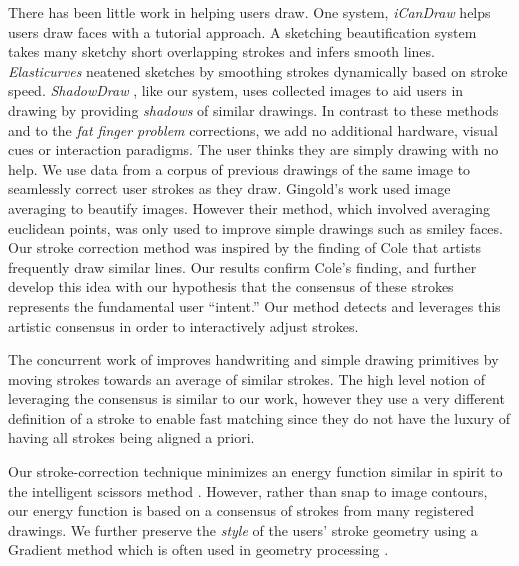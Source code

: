 There has been little work in helping users draw. One system, \emph{iCanDraw} \cite{Dixon:2010:IUS} helps users draw faces with a tutorial approach. A sketching beautification system~\cite{Orbay2011} takes many sketchy short overlapping strokes and infers smooth lines. \emph{Elasticurves} \cite{Thiel:2011} neatened sketches by smoothing strokes dynamically based on stroke speed.  \emph{ShadowDraw} \cite{Lee:2011}, like our system, uses collected images to aid users in drawing by providing {\em shadows} of similar drawings.  In contrast to these methods and to the \emph{fat finger problem} corrections, we add no additional hardware, visual cues or interaction paradigms. The user thinks they are simply drawing with no help. We use data from a corpus of previous drawings of the same image to seamlessly correct user strokes as they draw. Gingold's work used image averaging to beautify images. However their method, which involved averaging euclidean points, was only used to improve simple drawings such as smiley faces. Our stroke correction method was inspired by the finding of Cole \etal {} that artists frequently draw similar lines. Our results confirm Cole's finding, and further develop this idea with our hypothesis that the consensus of these strokes represents the fundamental user ``intent.'' Our method detects and leverages this artistic consensus in order to
interactively adjust strokes.

The concurrent work of \cite{Zitnick:2013} improves handwriting and simple drawing primitives by moving strokes towards an average of similar strokes. The high level notion of leveraging the consensus is similar to our work, however they use a very different definition of a stroke to enable fast matching since they do not have the luxury of having all strokes being aligned a priori.

Our stroke-correction technique minimizes an energy function similar
in spirit to the intelligent scissors
method \cite{Mortensen:1995:ISF}. However, rather than snap to image
contours, our energy function is based on a consensus of strokes from many
registered drawings. We further preserve the {\em style} of the
users' stroke geometry using a Gradient method which is often used
in geometry processing \cite{Botsch:2008:LVS}. 

